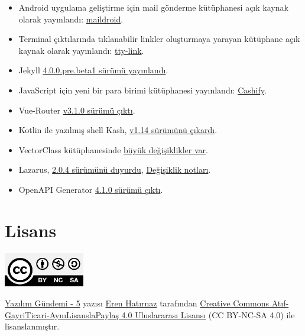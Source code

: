 \documentclass[11pt]{article}
\begin{document}
\begin{itemize}
\item Android uygulama geliştirme için mail gönderme kütüphanesi açık kaynak
olarak yayınlandı: \href{https://github.com/nedimf/maildroid}{maildroid}.
\item Terminal çıktılarında tıklanabilir linkler oluşturmaya yarayan kütüphane
açık kaynak olarak yayınlandı: \href{https://github.com/piotrmurach/tty-link}{tty-link}.
\item Jekyll \href{https://jekyllrb.com/news/2019/08/04/jekyll-4-0-0-pre-beta1-released/}{4.0.0.pre.beta1 sürümü yayınlandı}.
\item JavaScript için yeni bir para birimi kütüphanesi yayınlandı: \href{https://github.com/xxczaki/cashify}{Cashify}.
\item Vue-Router \href{https://github.com/vuejs/vue-router/releases/tag/v3.1.0}{v3.1.0 sürümü çıktı}.
\item Kotlin ile yazılmış shell Kash, \href{https://github.com/cbeust/kash/releases/tag/v1.14}{v1.14 sürümünü çıkardı}.
\item VectorClass kütüphanesinde \href{https://www.agner.org/optimize/blog/read.php?i=1013}{büyük değişiklikler var}.
\item Lazarus, \href{https://www.getlazarus.org/release/}{2.0.4 sürümünü duyurdu}, \href{https://wiki.lazarus.freepascal.org/Lazarus\_2.0.0\_release\_notes}{Değişiklik notları}.
\item OpenAPI Generator \href{https://github.com/OpenAPITools/openapi-generator/releases/tag/v4.1.0}{4.1.0 sürümü çıktı}.
\end{itemize}
\section{Lisans}
\label{sec:orgec730bf}
\begin{center}
\begin{center}
\includegraphics[height=1.5cm]{../../../img/CC_BY-NC-SA_4.0.png}
\end{center}

\href{yazilim-gundemi-05.pdf}{Yazılım Gündemi - 5} yazısı \href{https://erenhatirnaz.github.io}{Eren Hatırnaz} tarafından \href{http://creativecommons.org/licenses/by-nc-sa/4.0/}{Creative Commons
Atıf-GayriTicari-AynıLisanslaPaylaş 4.0 Uluslararası Lisansı} (CC BY-NC-SA 4.0)
ile lisanslanmıştır.
\end{center}
\end{document}
